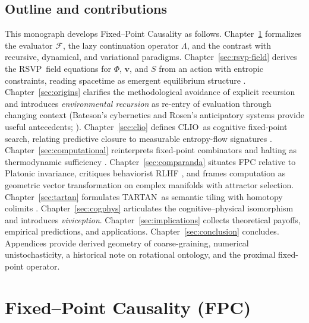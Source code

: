 \documentclass[12pt,a4paper]{article}
\newcommand{\Ph}{\Phi}                %
\newcommand{\Vv}{\mathbf{v}}          %
\newcommand{\Ss}{S}                   %
\newcommand{\RSVP}{RSVP}              %
\newcommand{\CLIO}{CLIO}              %
\newcommand{\TARTAN}{TARTAN}          %
\newcommand{\F}{\mathcal{F}}          %
\newcommand{\LambdaOp}{\Lambda}       %
\theoremstyle{plain}
\begin{document}
\subsection{Outline and contributions}
This monograph develops Fixed--Point Causality as follows. Chapter~\ref{sec:fpc} formalizes the evaluator \(\F\), the lazy continuation operator \(\LambdaOp\), and the contrast with recursive, dynamical, and variational paradigms. Chapter~\ref{sec:rsvp-field} derives the \RSVP\ field equations for \(\Ph\), \(\Vv\), and \(\Ss\) from an action with entropic constraints, reading spacetime as emergent equilibrium structure \citep{jacobson1995thermodynamics,verlinde2011origin,carney2023gravity}. Chapter~\ref{sec:origins} clarifies the methodological avoidance of explicit recursion and introduces \emph{environmental recursion} as re-entry of evaluation through changing context (Bateson’s cybernetics and Rosen’s anticipatory systems provide useful antecedents; \citealt{bateson1972steps,rosen1985anticipatory}). Chapter~\ref{sec:clio} defines \CLIO\ as cognitive fixed-point search, relating predictive closure to measurable entropy-flow signatures \citep{friston2023active,seth2022predictive}. Chapter~\ref{sec:computational} reinterprets fixed-point combinators and halting as thermodynamic sufficiency \citep{turing1936computable,kleene1952recursion,barendregt1984lambda,goodhart1975problems}. Chapter~\ref{sec:comparanda} situates FPC relative to Platonic invariance, critiques behaviorist RLHF \citep{christiano2017deep,leike2018scalable,gabriel2020alignment}, and frames computation as geometric vector transformation on complex manifolds with attractor selection. Chapter~\ref{sec:tartan} formulates \TARTAN\ as semantic tiling with homotopy colimits \citep{lawvere2009conceptual,baez2011physics,spivak2014database}. Chapter~\ref{sec:cogphys} articulates the cognitive--physical isomorphism and introduces \emph{viviception}. Chapter~\ref{sec:implications} collects theoretical payoffs, empirical predictions, and applications. Chapter~\ref{sec:conclusion} concludes. Appendices provide derived geometry of coarse-graining, numerical unistochasticity, a historical note on rotational ontology, and the proximal fixed-point operator.

\section{Fixed--Point Causality (FPC)}
\label{sec:fpc}
\end{document}
